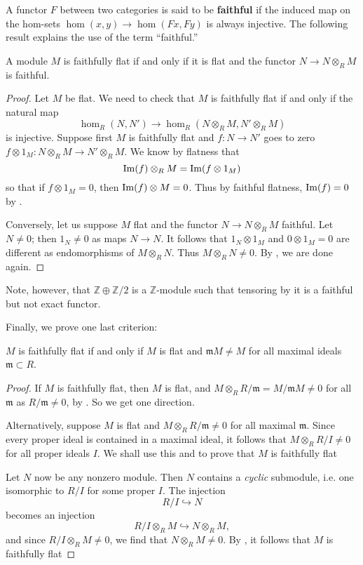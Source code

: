 A functor $F$ between two categories is said to be \textbf{faithful} if the
induced map on the hom-sets $\hom(x,y) \to \hom(Fx, Fy)$ is always injective.
The following result explains the use of the term ``faithful.''

\begin{proposition} 
A module $M$ is faithfully flat if and only if it is flat and the functor $N \to N
\otimes_R M$ is faithful.
\end{proposition} 
\begin{proof} Let $M$ be flat.
We need to check that $M$ is faithfully flat if and only if the natural map
\[ \hom_R(N, N') \to \hom_R(N \otimes_R M, N' \otimes_R M)  \]
is injective.
Suppose first $M$ is faithfully flat and $f: N \to N'$ goes to zero $f \otimes
1_M: N \otimes_R M \to  N' \otimes_R M$. We know by flatness that
\[ \operatorname{Im}(f) \otimes_R M = \operatorname{Im}(f \otimes 1_M)  \]
so that if $f \otimes 1_M = 0$, then $\operatorname{Im}(f) \otimes M = 0$. Thus by faithful
flatness, $\operatorname{Im}(f) = 0$ by .

Conversely, let us suppose $M$ flat and the functor $N \to N \otimes_R M$
faithful. Let $N \neq 0$; then $1_N \neq 0$ as maps $N \to N$. 
It follows that $1_N \otimes 1_M$ and $0 \otimes 1_M = 0$ are different as
endomorphisms of $M \otimes_R N$. Thus $M \otimes_R N \neq 0$. By
, we are done again.
\end{proof} 

\begin{example} 
Note, however, that $\mathbb{Z} \oplus \mathbb{Z}/2$ is a $\mathbb{Z}$-module
such that tensoring by it is a faithful but not exact functor.
\end{example} 

Finally, we prove one last criterion:

\begin{proposition} \label{ffmaximal} 
$M$ is faithfully flat if and only if $M$ is flat and $\mathfrak{m}M \neq M$ for all
maximal ideals $\mathfrak{m} \subset R$.
\end{proposition} 
\begin{proof} 
If $M$ is faithfully flat, then $M$ is flat, and $M \otimes_R R/\mathfrak{m} =
M/\mathfrak{m}M \neq 0$ for all $\mathfrak{m}$ as $R/\mathfrak{m} \neq 0$, by
. So we get one direction.

Alternatively, suppose $M$ is flat and $M \otimes_R R/\mathfrak{m} \neq 0$ for
all maximal $\mathfrak{m}$. Since every proper ideal is contained in a maximal
ideal, it follows that $M \otimes_R R/I \neq 0$ for all proper ideals $I$. We
shall use this and  to prove that $M$ is faithfully flat

Let $N$ now be any nonzero module. Then $N$ contains a \emph{cyclic} submodule, i.e.
one isomorphic to $R/I$ for some proper $I$. The injection
\[ R/I \hookrightarrow N  \]
becomes an injection
\[ R/I \otimes_R M \hookrightarrow N \otimes_R M,  \]
and since $R/I \otimes_R M \neq 0$, we find that $N \otimes_R M \neq 0$. By
, it follows that $M$ is faithfully flat
\end{proof} 

